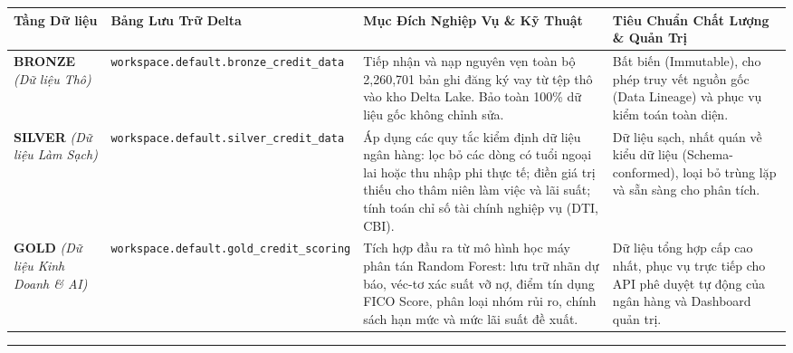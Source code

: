 \documentclass[
  13pt,
  a4paper,
]{report}
\newcounter{none} %
\begin{document}
{\def\LTcaptype{none} %
\begin{longtable}[]{@{}
  >{\raggedright\arraybackslash}p{}
  >{\raggedright\arraybackslash}p{}
  >{\raggedright\arraybackslash}p{}
  >{\raggedright\arraybackslash}p{}@{}}
\toprule\noalign{}
\begin{minipage}[b]{\linewidth}\raggedright
Tầng Dữ liệu
\end{minipage} & \begin{minipage}[b]{\linewidth}\raggedright
Bảng Lưu Trữ Delta
\end{minipage} & \begin{minipage}[b]{\linewidth}\raggedright
Mục Đích Nghiệp Vụ \& Kỹ Thuật
\end{minipage} & \begin{minipage}[b]{\linewidth}\raggedright
Tiêu Chuẩn Chất Lượng \& Quản Trị
\end{minipage} \\
\midrule\noalign{}
\endhead
\bottomrule\noalign{}
\endlastfoot
\textbf{BRONZE} \emph{(Dữ liệu Thô)} &
\texttt{workspace.default.bronze\_credit\_data} & Tiếp nhận và nạp
nguyên vẹn toàn bộ 2,260,701 bản ghi đăng ký vay từ tệp thô vào kho
Delta Lake. Bảo toàn 100\% dữ liệu gốc không chỉnh sửa. & Bất biến
(Immutable), cho phép truy vết nguồn gốc (Data Lineage) và phục vụ kiểm
toán toàn diện. \\
\textbf{SILVER} \emph{(Dữ liệu Làm Sạch)} &
\texttt{workspace.default.silver\_credit\_data} & Áp dụng các quy tắc
kiểm định dữ liệu ngân hàng: lọc bỏ các dòng có tuổi ngoại lai hoặc thu
nhập phi thực tế; điền giá trị thiếu cho thâm niên làm việc và lãi suất;
tính toán chỉ số tài chính nghiệp vụ (DTI, CBI). & Dữ liệu sạch, nhất
quán về kiểu dữ liệu (Schema-conformed), loại bỏ trùng lặp và sẵn sàng
cho phân tích. \\
\textbf{GOLD} \emph{(Dữ liệu Kinh Doanh \& AI)} &
\texttt{workspace.default.gold\_credit\_scoring} & Tích hợp đầu ra từ mô
hình học máy phân tán Random Forest: lưu trữ nhãn dự báo, véc-tơ xác
suất vỡ nợ, điểm tín dụng FICO Score, phân loại nhóm rủi ro, chính sách
hạn mức và mức lãi suất đề xuất. & Dữ liệu tổng hợp cấp cao nhất, phục
vụ trực tiếp cho API phê duyệt tự động của ngân hàng và Dashboard quản
trị. \\
\end{longtable}
}

\begin{center}\rule{0.5\linewidth}{0.5pt}\end{center}
\end{document}
